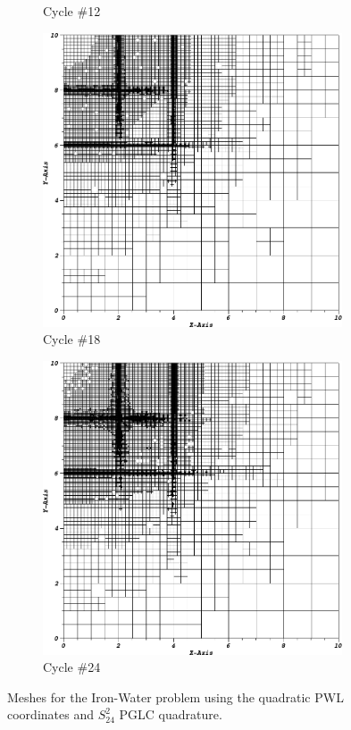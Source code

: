\begin{figure}
\begin{subfigure}[b]{0.485\textwidth}
		\caption{Cycle \#12}
	\end{subfigure}
	\vfill
	\begin{subfigure}[b]{0.485\textwidth}
		\centering
		\includegraphics[width=0.975\textwidth]{figures/sec_DSA/IW_PWLD2_PGLC24_cyc18.png}
		\caption{Cycle \#18}
	\end{subfigure}
	\hfill
	\begin{subfigure}[b]{0.485\textwidth}
		\centering
		\includegraphics[width=0.975\textwidth]{figures/sec_DSA/IW_PWLD2_PGLC24_cyc24.png}
		\caption{Cycle \#24}
	\end{subfigure}
\caption{Meshes for the Iron-Water problem using the quadratic PWL coordinates and $S_{24}^2$ PGLC quadrature.}
\label{fig::IW_PWLD2_PGLC24_meshes}
\end{figure}

